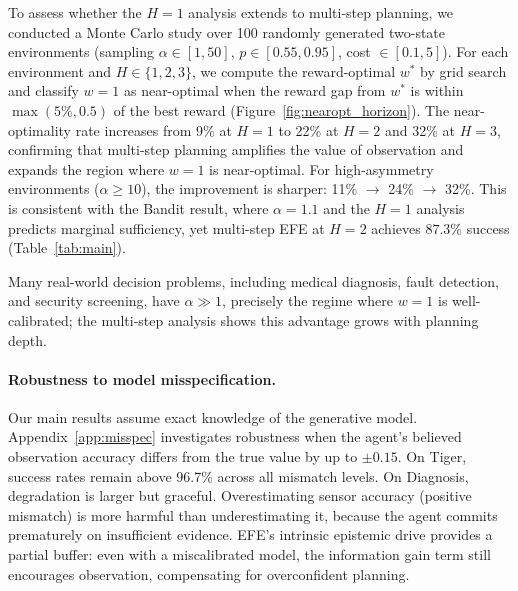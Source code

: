 \documentclass{article}
\begin{document}
To assess whether the $H{=}1$ analysis extends to multi-step planning, we conducted a Monte Carlo study over 100 randomly generated two-state environments (sampling $\alpha \in [1, 50]$, $p \in [0.55, 0.95]$, cost $\in [0.1, 5]$). For each environment and $H \in \{1, 2, 3\}$, we compute the reward-optimal $w^*$ by grid search and classify $w{=}1$ as near-optimal when the reward gap from $w^*$ is within $\max(5\%, 0.5)$ of the best reward (Figure~\ref{fig:nearopt_horizon}). The near-optimality rate increases from 9\% at $H{=}1$ to 22\% at $H{=}2$ and 32\% at $H{=}3$, confirming that multi-step planning amplifies the value of observation and expands the region where $w{=}1$ is near-optimal. For high-asymmetry environments ($\alpha \geq 10$), the improvement is sharper: 11\% $\to$ 24\% $\to$ 32\%. This is consistent with the Bandit result, where $\alpha{=}1.1$ and the $H{=}1$ analysis predicts marginal sufficiency, yet multi-step EFE at $H{=}2$ achieves $87.3\%$ success (Table~\ref{tab:main}).

Many real-world decision problems, including medical diagnosis, fault detection, and security screening, have $\alpha \gg 1$, precisely the regime where $w{=}1$ is well-calibrated; the multi-step analysis shows this advantage grows with planning depth.

\paragraph{Robustness to model misspecification.}
Our main results assume exact knowledge of the generative model. Appendix~\ref{app:misspec} investigates robustness when the agent's believed observation accuracy differs from the true value by up to $\pm 0.15$. On Tiger, success rates remain above 96.7\% across all mismatch levels. On Diagnosis, degradation is larger but graceful. Overestimating sensor accuracy (positive mismatch) is more harmful than underestimating it, because the agent commits prematurely on insufficient evidence. EFE's intrinsic epistemic drive provides a partial buffer: even with a miscalibrated model, the information gain term still encourages observation, compensating for overconfident planning.
\end{document}
